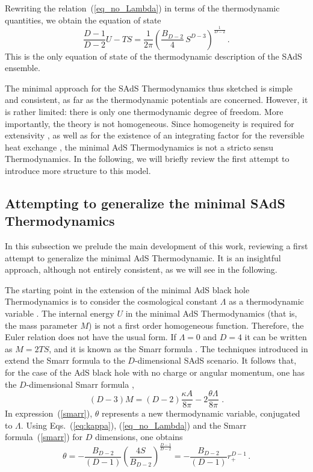 \documentclass[prd,onecolumn,notitlepage,amsmath,nofootinbib,superscriptaddress,showpacs,showkeys]{revtex4-1}
\begin{document}
Rewriting the relation~(\ref{eq_no_Lambda}) in terms of the thermodynamic
quantities, we obtain the equation of state 
\begin{equation}
\frac{D-1}{D-2}U-TS=\frac{1}{2\pi}\left(\frac{B_{D-2}}{4}\, S^{D-3}\right)^{\frac{1}{D-2}}\,.\label{eq:kappa2}
\end{equation}
 This is the only equation of state of the thermodynamic description
of the SAdS ensemble.

The minimal approach for the SAdS Thermodynamics thus sketched is
simple and consistent, as far as the thermodynamic potentials are
concerned. However, it is rather limited: there is only one thermodynamic
degree of freedom. More importantly, the theory is not homogeneous.
Since homogeneity is required for extensivity \cite{kastor2009},
as well as for the existence of an integrating factor for the reversible
heat exchange \cite{bel2-2005}, the minimal AdS Thermodynamics is
not a stricto sensu Thermodynamics. In the following, we will briefly
review the first attempt to introduce more structure to this model. 


\subsection{\label{first_extension}Attempting to generalize the minimal SAdS
Thermodynamics}

In this subsection we prelude the main development of this
work, reviewing a first attempt to generalize the minimal AdS Thermodynamic. 
It is an insightful approach, although not entirely consistent, as we will see in the following.

The starting point in the extension of the minimal AdS black hole
Thermodynamics is to consider the cosmological constant $\Lambda$
as a thermodynamic variable \cite{21,seki2006,29}. The internal
energy $U$ in the minimal AdS Thermodynamics (that is, the mass parameter
$M$) is not a first order homogeneous function. Therefore, the Euler
relation does not have the usual form. If $\Lambda=0$ and $D=4$
it can be written as $M=2TS$, and it is known as the Smarr formula
\cite{smarr73}. The techniques introduced in \cite{kastor2009,seki2006}
extend the Smarr formula to the $D$-dimensional SAdS scenario. It
follows that, for the case of the AdS black hole with no charge or
angular momentum, one has the $D$-dimensional Smarr formula \cite{kastor2010},
\begin{equation}
\left(D-3\right)M=\left(D-2\right)\frac{\kappa A}{8\pi}-2\frac{\theta\Lambda}{8\pi}\,\,.\label{smarr}
\end{equation}
In expression~(\ref{smarr}), $\theta$ represents a new thermodynamic
variable, conjugated to $\Lambda$. Using Eqs.~(\ref{eq:kappa}),
(\ref{eq_no_Lambda}) and the Smarr formula~(\ref{smarr}) for $D$
dimensions, one obtains 
\begin{equation}
\theta=-\frac{B_{D-2}}{\left(D-1\right)}\left(\frac{4S}{B_{D-2}}\right)^{\frac{D-1}{D-2}}=-\frac{B_{D-2}}{\left(D-1\right)}r_{+}^{D-1}\,.\label{vol}
\end{equation}
\end{document}
